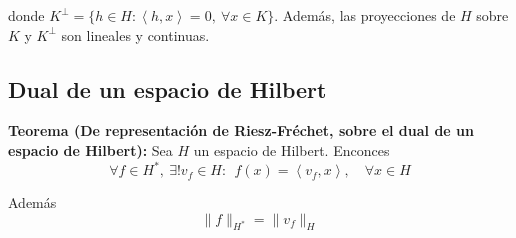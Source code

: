 \documentclass{article}
\begin{document}
donde $K^\bot=\{h\in H:\left\langle h,x\right\rangle = 0,\:\forall x\in K\}$. Además, las proyecciones de $H$ sobre $K$ y $K^\bot$ son lineales y continuas.

\subsection{Dual de un espacio de Hilbert}
\textbf{Teorema (De representación de Riesz-Fréchet, sobre el dual de un espacio de Hilbert):} Sea $H$ un espacio de Hilbert. Enconces
\begin{equation*}
\forall f\in H^*,\:\exists!v_f\in H:\:\:f(x)=\left\langle v_f,x\right\rangle,\quad \forall x\in H
\end{equation*}

Además
\begin{equation*}
\|f\|_{H^*}=\|v_f\|_{H}
\end{equation*}
\end{document}
